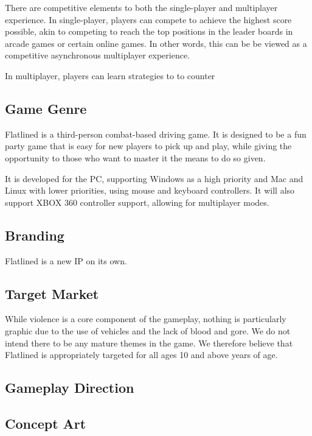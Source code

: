 \documentclass{article}
\newcommand{\name}{Flatlined}
\theoremstyle{definition}
\begin{document}
There are competitive elements to both the single-player and multiplayer
experience. In single-player, players can compete to achieve the highest score
possible, akin to competing to reach the top positions in the leader boards
in arcade games or certain online games. In other words, this can be be viewed
as a competitive asynchronous multiplayer experience.

In multiplayer, players can learn strategies to to counter 

\subsection{Game Genre} %

\name{} is a third-person combat-based driving game. It is designed to be
a fun party game that is easy for new players to pick up and play, while giving
the opportunity to those who want to master it the means to do so given.

It is developed for the PC, supporting Windows as a high priority and Mac and
Linux with lower priorities, using mouse and keyboard controllers. It will also
support XBOX 360 controller support, allowing for multiplayer modes.

\subsection{Branding}

\name{} is a new IP on its own.

\subsection{Target Market}

While violence is a core component of the gameplay, nothing is particularly
graphic due to the use of vehicles and the lack of blood and gore. We do not
intend there to be any mature themes in the game. We therefore believe that
\name{} is appropriately targeted for all ages 10 and above years of age.

\subsection{Gameplay Direction} %


\subsection{Concept Art}
\end{document}
